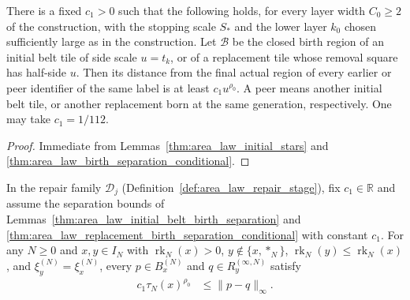 \begin{lemma}
    \label{thm:area_law_birth_separation}
    \leanok
    There is a fixed $c_1>0$ such that the following holds, for every layer
    width $C_0\ge2$ of the construction, with the stopping scale $S_*$ and
    the lower layer $k_0$ chosen sufficiently large as in the construction. Let $\mathcal B$ be the closed birth region of an initial
    belt tile of side scale $u=t_k$, or of a replacement tile whose removal
    square has half-side $u$. Then its distance from the final actual region
    of every earlier or peer identifier of the same label is at least
    $c_1u^{\rho_0}$. A peer means
    another initial belt tile, or another replacement born at the same
    generation, respectively. One may take $c_1=1/112$.
\end{lemma}

\begin{proof}
    \leanok
    Immediate from Lemmas~\ref{thm:area_law_initial_stars} and
    \ref{thm:area_law_birth_separation_conditional}.
\end{proof}

\begin{lemma}
    \label{thm:area_law_birth_separation_common_stage}
    \leanok
    In the repair family $\mathcal D_j$ (Definition~\ref{def:area_law_repair_stage}), fix
    $c_1\in\mathbb R$ and assume the separation bounds of
    Lemmas~\ref{thm:area_law_initial_belt_birth_separation} and
    \ref{thm:area_law_replacement_birth_separation_conditional} with constant $c_1$.
    For any $N\ge0$ and $x,y\in I_N$ with $\operatorname{rk}_N(x)>0$, $y\notin\{x,*_N\}$,
    $\operatorname{rk}_N(y)\le\operatorname{rk}_N(x)$, and $\xi_y^{(N)}=\xi_x^{(N)}$, every
    $p\in B_x^{(N)}$ and $q\in R_y^{(\infty,N)}$ satisfy
    \begin{align}
        c_1\tau_N(x)^{\rho_0} & \le\|p-q\|_\infty.
        \label{eq:area_law_birth_separation_common_stage}
    \end{align}
\end{lemma}

